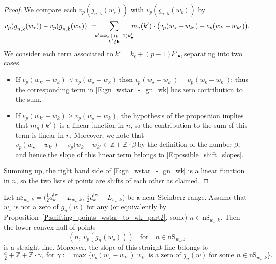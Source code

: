 \begin{proof}
    We compare each $v_p(g_{n,\hat {{\mathbf{k}}}}(w_\star))$ with $v_p(g_{n,\hat {{\mathbf{k}}}}(w_k))$ by
    \begin{equation}
    \label{E:gn_wstar_-_gn_wk}
    v_p(g_{n,\hat {{\mathbf{k}}}}(w_\star))  - v_p(g_{n,\hat {{\mathbf{k}}}}(w_k))\ =\hspace{-5pt} \sum_{\substack{k'= k_\varepsilon+(p-1)k'_\bullet \\ k'  \notin {\mathbf{k}}}}\hspace{-5pt} m_n(k')\cdot \big( v_p(w_\star - w_{k'}) - v_p(w_k-w_{k'}  ) \big).
    \end{equation}
    We consider each term associated to $k' = k_\varepsilon + (p-1)k'_\bullet$, separating into two cases.
    \begin{itemize}
    \item
    If $v_p(w_{k'} - w_k)  <v_p(w_\star - w_k)$ then  $v_p(w_\star - w_{k'} ) = v_p(w_k - w_{k'})$; thus the corresponding term in \eqref{E:gn_wstar_-_gn_wk} has zero contribution to the sum.
    \item
    If $v_p(w_{k'} - w_k)  \geq v_p(w_\star - w_k)$, the hypothesis of the proposition implies that $m_n(k')$ is a linear function in $n$, so the contribution to the sum of this term is linear in $n$.  Moreover, we note that $v_p(w_\star - w_{k'}) - v_p(w_k-w_{k'} \in {\mathbb{Z}}+{\mathbb{Z}}\cdot \beta$ by the definition of the number $\beta$, and hence  the slope of this linear term belongs to \eqref{E:possible_shift_slopes}.
    \end{itemize}
    Summing up, the right hand side of \eqref{E:gn_wstar_-_gn_wk} is a linear function in $n$, so the two lists of points are shifts of each other as claimed.
\end{proof}

\begin{corollary}
    \label{C:near-Steinberg_gt_straightline_part1}
    Let $ {\mathrm{nS}}_{w_\star, k} = \big(\tfrac 12 d_{k}^{\mathrm{Iw}}- L_{w_\star, k},\, \tfrac 12 d_{k}^{\mathrm{Iw}}+ L_{ w_\star, k} \big)$ be a  near-Steinberg range.
    Assume that $w_\star$ is not a zero of $g_n(w)$ for any (or equivalently by Proposition~\ref{P:shifting_points_wstar_to_wk_part2},  some) $n \in {\mathrm{nS}}_{w_\star, k}$. Then the lower convex hull of points
    $$
    (n, \ v_p(g_n(w_\star))) \quad \textrm{for} \quad n \in \overline {\mathrm{nS}}_{w_\star, k}
    $$
    is a straight line. Moreover, the slope of this straight line belongs to
    \begin{equation}
    \label{E:possible_slopes}
    \tfrac a2+{\mathbb{Z}}+ {\mathbb{Z}}\cdot \gamma, \text{~for~} \gamma:= \max\{ v_p(w_\star - w_{k'})| w_{k'} \text{~is a zero of~} g_n(w) \text{~for some~} n\in {\mathrm{nS}}_{w_\star,k}  \} .
    \end{equation}
\end{corollary}

